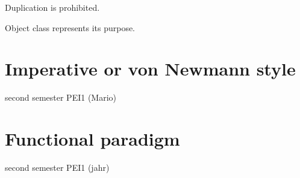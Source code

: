 Duplication is prohibited. 

Object class represents its purpose. 



\section{Imperative or von Newmann style} 
second semester PEI1 (Mario)

\section{Functional paradigm} 
second semester PEI1 (jahr)

 
 
 
 
 

